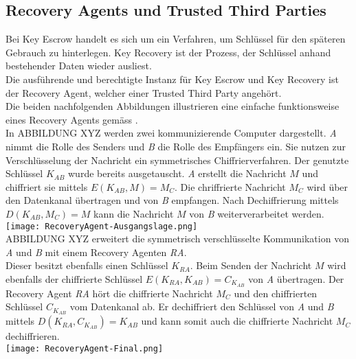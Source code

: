 	\subsection{Recovery Agents und Trusted Third Parties}
Bei Key Escrow handelt es sich um ein Verfahren, um Schlüssel für den späteren Gebrauch zu hinterlegen. Key Recovery ist der Prozess, der Schlüssel anhand bestehender Daten wieder ausliest.
\\
Die ausführende und berechtigte Instanz für Key Escrow und Key Recovery ist der Recovery Agent, welcher einer Trusted Third Party angehört.
\\
Die beiden nachfolgenden Abbildungen illustrieren eine einfache funktionsweise eines Recovery Agents gemäss \cite{ISSS}.
\\
In ABBILDUNG XYZ werden zwei kommunizierende Computer dargestellt. \textit{A} nimmt die Rolle des Senders und \textit{B} die Rolle des Empfängers ein. Sie nutzen zur Verschlüsselung der Nachricht ein symmetrisches Chiffrierverfahren. Der genutzte Schlüssel $K_{AB}$ wurde bereits ausgetauscht. \textit{A} erstellt die Nachricht $M$ und chiffriert sie mittels $E(K_{AB},M)=M_{C}$. Die chriffrierte Nachricht $M_{C}$ wird über den Datenkanal übertragen und von \textit{B} empfangen. Nach Dechiffrierung mittels $D(K_{AB},M_{C})=M$ kann die Nachricht $M$ von \textit{B} weiterverarbeitet werden.
\\
\texttt{[image: RecoveryAgent-Ausgangslage.png]} \\
ABBILDUNG XYZ erweitert die symmetrisch verschlüsselte Kommunikation von \textit{A} und \textit{B} mit einem Recovery Agenten \textit{RA}.
\\
Dieser besitzt ebenfalls einen Schlüssel $K_{RA}$. Beim Senden der Nachricht $M$ wird ebenfalls der chiffrierte Schlüssel $E(K_{RA},K_{AB})=C_{K_{AB}}$ von \textit{A} übertragen. Der Recovery Agent \textit{RA} hört die chiffrierte Nachricht $M_{C}$ und den chiffrierten Schlüssel $C_{K_{AB}}$ vom Datenkanal ab. Er dechiffriert den Schlüssel von \textit{A} und \textit{B} mittels $D(K_{RA}, C_{K_{AB}})=K_{AB}$ und kann somit auch die chiffrierte Nachricht $M_{C}$ dechiffrieren.
\\
\texttt{[image: RecoveryAgent-Final.png]}
